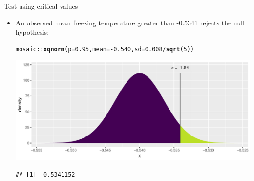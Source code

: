 \documentclass[handout]{beamer}\usepackage[]{graphicx}\usepackage[]{color}
\newcommand{\hlnum}[1]{\textcolor[rgb]{0.686,0.059,0.569}{#1}}%
\newcommand{\hlopt}[1]{\textcolor[rgb]{0,0,0}{#1}}%
\newcommand{\hlstd}[1]{\textcolor[rgb]{0.345,0.345,0.345}{#1}}%
\newcommand{\hlkwc}[1]{\textcolor[rgb]{0.333,0.667,0.333}{#1}}%
\newcommand{\hlkwd}[1]{\textcolor[rgb]{0.737,0.353,0.396}{\textbf{#1}}}%
\newenvironment{knitrout}{}{} %
\begin{document}
\begin{frame}[fragile]{Test using critical values}
\begin{itemize}

	\item An observed mean freezing temperature greater than -0.5341 rejects the null hypothesis:
	
\begin{knitrout}\scriptsize
{}\color{fgcolor}
\begin{alltt}
\hlstd{mosaic}\hlopt{::}\hlkwd{xqnorm}\hlstd{(}\hlkwc{p} \hlstd{=} \hlnum{0.95}\hlstd{,} \hlkwc{mean} \hlstd{=} \hlopt{-}\hlnum{0.540}\hlstd{,} \hlkwc{sd} \hlstd{=} \hlnum{0.008}\hlopt{/}\hlkwd{sqrt}\hlstd{(}\hlnum{5}\hlstd{))}
\end{alltt}


{\ttfamily\noindent\itshape\color{messagecolor}{\#\# }}

{\ttfamily\noindent\itshape{}}

{\ttfamily\noindent\itshape\color{messagecolor}{\#\# 	P(X <= -0.5341152) = 0.95}}

{\ttfamily\noindent\itshape\color{messagecolor}{\#\# 	P(X >\ \ -0.5341152) = 0.05}}

{\ttfamily\noindent\itshape\color{messagecolor}{\#\# }}

{\centering \includegraphics[width=1\linewidth]{figure/unnamed-chunk-3-1} 

}


\begin{verbatim}
## [1] -0.5341152
\end{verbatim}

\end{knitrout}

	
\end{itemize}
\end{frame}
\end{document}
